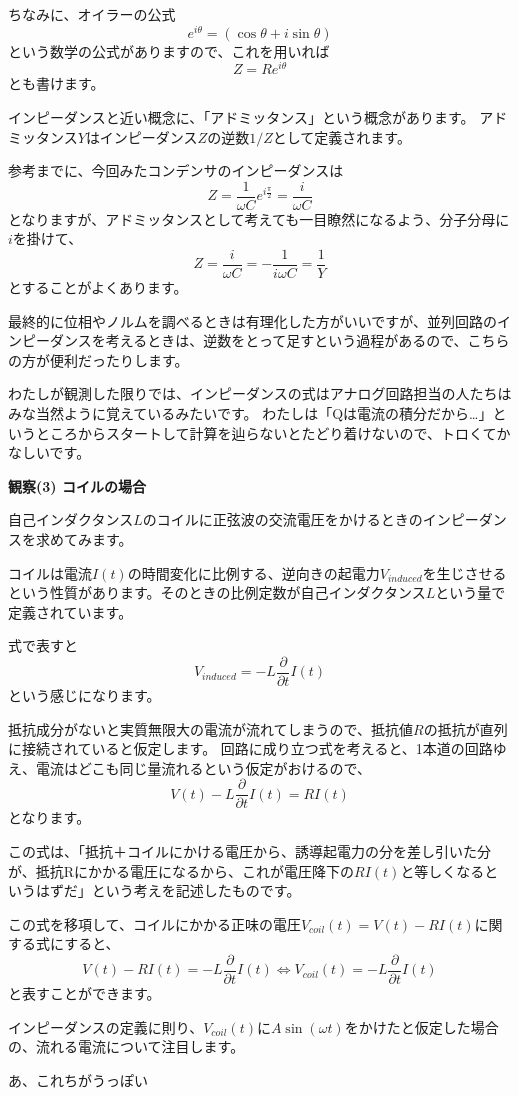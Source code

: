 ちなみに、オイラーの公式
$$e^{i\theta} = (\cos \theta + i \sin \theta)$$
という数学の公式がありますので、これを用いれば
$$ Z = R e^{i\theta}$$
とも書けます。

\begin{tcolorbox}[title=インピーダンスとアドミッタンス]
    インピーダンスと近い概念に、「アドミッタンス」という概念があります。
    アドミッタンス$Y$はインピーダンス$Z$の逆数$1/Z$として定義されます。

    参考までに、今回みたコンデンサのインピーダンスは
    $$ Z = \frac{1}{\omega C} e^{i\frac{\pi}{2}} = \frac{i}{\omega C}$$
    となりますが、アドミッタンスとして考えても一目瞭然になるよう、分子分母に$i$を掛けて、
    $$ Z = \frac{i}{\omega C} = -\frac{1}{i\omega C} = \frac{1}{Y}$$
    とすることがよくあります。

    最終的に位相やノルムを調べるときは有理化した方がいいですが、並列回路のインピーダンスを考えるときは、逆数をとって足すという過程があるので、こちらの方が便利だったりします。

    わたしが観測した限りでは、インピーダンスの式はアナログ回路担当の人たちはみな当然ように覚えているみたいです。
    わたしは「Qは電流の積分だから…」というところからスタートして計算を辿らないとたどり着けないので、トロくてかなしいです。
\end{tcolorbox}


\textbf{観察(3) コイルの場合}

自己インダクタンス$L$のコイルに正弦波の交流電圧をかけるときのインピーダンスを求めてみます。

コイルは電流$I(t)$の時間変化に比例する、逆向きの起電力$V_{induced}$を生じさせるという性質があります。そのときの比例定数が自己インダクタンス$L$という量で定義されています。

式で表すと
$$V_{induced} = -L\frac{\partial}{\partial t}I(t)$$
という感じになります。

抵抗成分がないと実質無限大の電流が流れてしまうので、抵抗値$R$の抵抗が直列に接続されていると仮定します。
回路に成り立つ式を考えると、1本道の回路ゆえ、電流はどこも同じ量流れるという仮定がおけるので、
$$V(t)-L\frac{\partial}{\partial t}I(t) = R I(t)$$
となります。

この式は、「抵抗＋コイルにかける電圧から、誘導起電力の分を差し引いた分が、抵抗Rにかかる電圧になるから、これが電圧降下の$RI(t)$と等しくなるというはずだ」という考えを記述したものです。

この式を移項して、コイルにかかる正味の電圧$V_{coil}(t) = V(t)-RI(t)$に関する式にすると、
$$V(t) - R I(t) = -L\frac{\partial}{\partial t}I(t) \Leftrightarrow V_{coil}(t) = -L\frac{\partial}{\partial t}I(t) $$
と表すことができます。

インピーダンスの定義に則り、$V_{coil}(t)$に$A\sin(\omega t)$をかけたと仮定した場合の、流れる電流について注目します。


あ、これちがうっぽい